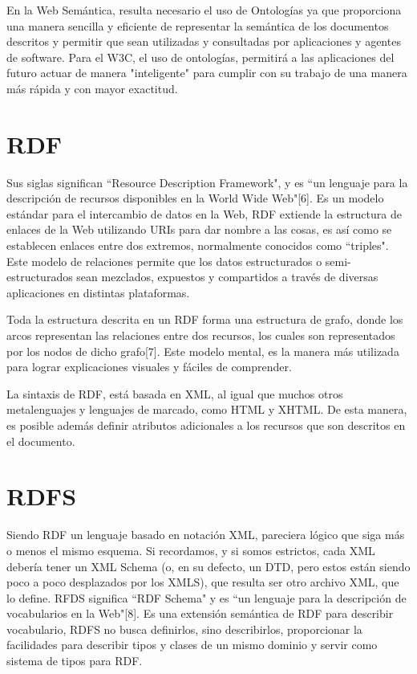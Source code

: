 En la Web Semántica, resulta necesario el uso de Ontologías ya que proporciona una manera sencilla y eficiente de representar la semántica de los documentos descritos y permitir que sean utilizadas y consultadas por aplicaciones y agentes de software. Para el W3C, el uso de ontologías, permitirá a las aplicaciones del futuro actuar de manera "inteligente" para cumplir con su trabajo de una manera más rápida y con mayor exactitud.

\section{RDF}

Sus siglas significan ``Resource Description Framework", y es ``un lenguaje para la descripción de recursos disponibles en la World Wide Web"[6]. Es un modelo estándar para el intercambio de datos en la Web, RDF extiende la estructura de enlaces de la Web utilizando URIs para dar nombre a las cosas, es así como se establecen enlaces entre dos extremos, normalmente conocidos como ``triples". Este modelo de relaciones permite que los datos estructurados o semi-estructurados sean mezclados, expuestos y compartidos a través de diversas aplicaciones en distintas plataformas.

Toda la estructura descrita en un RDF forma una estructura de grafo, donde los arcos representan las relaciones entre dos recursos, los cuales son representados por los nodos de dicho grafo[7]. Este modelo mental, es la manera más utilizada para lograr explicaciones visuales y fáciles de comprender.

La sintaxis de RDF, está basada en XML, al igual que muchos otros metalenguajes y lenguajes de marcado, como HTML y XHTML. De esta manera, es posible además definir atributos adicionales a los recursos que son descritos en el documento.

\section{RDFS}

Siendo RDF un lenguaje basado en notación XML, pareciera lógico que siga más o menos el mismo esquema. Si recordamos, y si somos estrictos, cada XML debería tener un XML Schema (o, en su defecto, un DTD, pero estos están siendo poco a poco desplazados por los XMLS), que resulta ser otro archivo XML, que lo define. RFDS significa ``RDF Schema" y es ``un lenguaje para la descripción de vocabularios en la Web"[8]. Es una extensión semántica de RDF para describir vocabulario, RDFS no busca definirlos, sino describirlos, proporcionar la facilidades para describir tipos y clases de un mismo dominio y servir como sistema de tipos para RDF.

